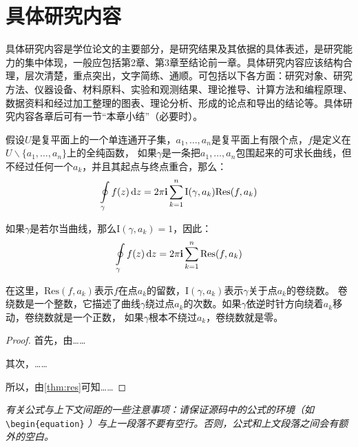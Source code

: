 
\chapter{具体研究内容}

具体研究内容是学位论文的主要部分，是研究结果及其依据的具体表述，是研究能力的集中体现，一般应包括第2章、第3章至结论前一章。具体研究内容应该结构合理，层次清楚，重点突出，文字简练、通顺。可包括以下各方面：研究对象、研究方法、仪器设备、材料原料、实验和观测结果、理论推导、计算方法和编程原理、数据资料和经过加工整理的图表、理论分析、形成的论点和导出的结论等。具体研究内容各章后可有一节“本章小结”（必要时）。

\begin{them}[留数定理]
\label{thm:res}
  假设$U$是复平面上的一个单连通开子集，$a_1,\ldots,a_n$是复平面上有限个点，$f$是定义在$U\backslash \{a_1,\ldots,a_n\}$上的全纯函数，
  如果$\gamma$是一条把$a_1,\ldots,a_n$包围起来的可求长曲线，但不经过任何一个$a_k$，并且其起点与终点重合，那么：
  \begin{equation}
    \label{eq:res}
    \ointop_{\gamma}f(z)\,\mathrm{d}z = 2\pi\mathbf{i}\sum^n_{k=1}\mathrm{I}(\gamma,a_k)\mathrm{Res}(f,a_k)
  \end{equation}

  如果$\gamma$是若尔当曲线，那么$\mathrm{I}(\gamma, a_k)=1$，因此：
  \begin{equation}
    \label{eq:resthm}
    \ointop_{\gamma}f(z)\,\mathrm{d}z = 2\pi\mathbf{i}\sum^n_{k=1}\mathrm{Res}(f,a_k)
  \end{equation}

  在这里，$\mathrm{Res}(f, a_k)$表示$f$在点$a_k$的留数，$\mathrm{I}(\gamma,a_k)$表示$\gamma$关于点$a_k$的卷绕数。
  卷绕数是一个整数，它描述了曲线$\gamma$绕过点$a_k$的次数。如果$\gamma$依逆时针方向绕着$a_k$移动，卷绕数就是一个正数，
  如果$\gamma$根本不绕过$a_k$，卷绕数就是零。
\end{them}

\begin{proof}
  首先，由……

  其次，……

  所以，由\autoref{thm:res}可知……
  \qedhere
\end{proof}

\textit{有关公式与上下文间距的一些注意事项：请保证源码中的公式的环境（如}
\\ \verb|\begin{equation}|
  \textit{）与上一段落不要有空行。否则，公式和上文段落之间会有额外的空白。}
